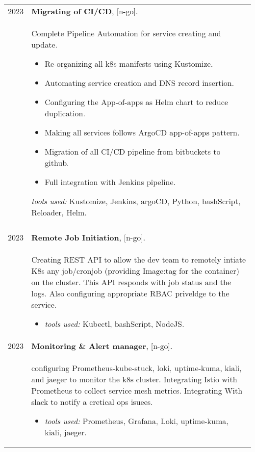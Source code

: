 \documentclass[a4paper,10pt]{article}
\begin{document}
\begin{longtable}{r p{16cm}}
        2023  & \textbf{Migrating of CI/CD}, [n-go].\\&
        Complete Pipeline Automation for service creating and update.
        \begin{itemize}
            \item Re-organizing all k8s manifests using Kustomize.
            \item Automating service creation and DNS record insertion. 
            \item Configuring the App-of-apps as Helm chart to reduce duplication.
            \item Making all services follows ArgoCD app-of-apps pattern.
            \item Migration of all CI/CD pipeline from bitbuckets to github.
            \item Full integration with Jenkins pipeline. 
        \end{itemize}
        \textit{tools used: } Kustomize, Jenkins, argoCD, Python, bashScript, Reloader, Helm.\\
        &\\ 
        2023  & \textbf{Remote Job Initiation}, [n-go].\\&
        Creating REST API to allow the dev team to remotely intiate K8s any job/cronjob (providing Image:tag for the container) on the cluster. This API responds with job status and the logs. Also configuring appropriate RBAC priveldge to the service.
        \begin{itemize}
            \item \textit{tools used: } Kubectl, bashScript, NodeJS.
        \end{itemize}\\

        2023  & \textbf{Monitoring \& Alert manager}, [n-go].\\&
        configuring Prometheus-kube-stuck, loki, uptime-kuma, kiali, and jaeger to monitor the k8s cluster. Integrating Istio with Prometheus to collect service mesh metrics. Integrating With slack to notify a cretical ops isuees.
        \begin{itemize}
            \item \textit{tools used: } Prometheus, Grafana, Loki, uptime-kuma, kiali, jaeger.
        \end{itemize}\\


\end{longtable}
\end{document}
